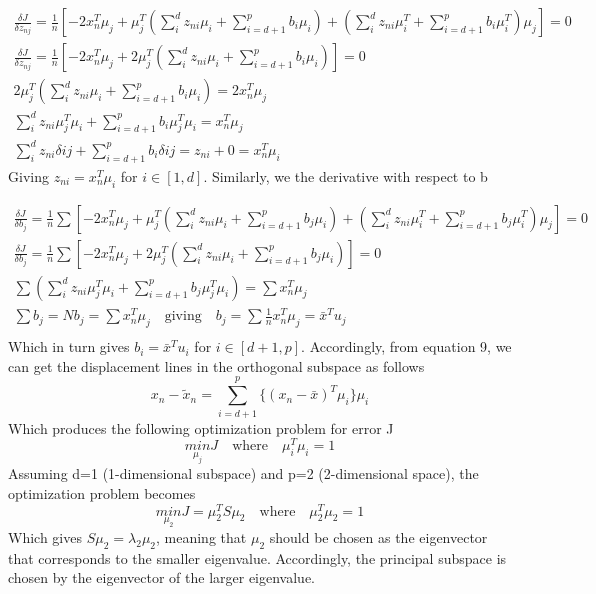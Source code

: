 \documentclass[12pt,a4paper]{article}
\begin{document}
	\vspace{-0.3cm}
	\begin{align*}
		\frac{\delta J}{\delta z_{nj}} = \frac{1}{n}[ -2x_n^T\mu_j+\mu_j^T(\sum_{i}^{d}z_{ni}\mu_i + \sum_{i=d+1}^{p}b_i\mu_i) + (\sum_{i}^{d}z_{ni}\mu_i^T + \sum_{i=d+1}^{p}b_i\mu_i^T)\mu_j] = 0 \\ 
		\frac{\delta J}{\delta z_{nj}} = \frac{1}{n}[ -2x_n^T\mu_j + 2 \mu_j^T(\sum_{i}^{d}z_{ni}\mu_i + \sum_{i=d+1}^{p}b_i\mu_i)] = 0 \qquad \qquad \\ 
		2 \mu_j^T(\sum_{i}^{d}z_{ni}\mu_i + \sum_{i=d+1}^{p}b_i\mu_i)= 2x_n^T\mu_j \qquad \qquad\qquad \quad\\
		\sum_{i}^{d}z_{ni}\mu_j^T\mu_i + \sum_{i=d+1}^{p}b_i\mu_j^T\mu_i=  x_n^T\mu_j \qquad \qquad\qquad \quad \\
		\sum_{i}^{d}z_{ni}\delta ij + \sum_{i=d+1}^{p}b_i\delta ij = z_{ni}+0 = x_n^T\mu_i \qquad \qquad\qquad \quad
	\end{align*}
	Giving $z_{ni}= x_n^T\mu_i$ for $i\in [1,d]$. Similarly, we the derivative with respect to b

	\vspace{-0.3cm}
	\begin{align*}
		\frac{\delta J}{\delta b_{j}} = \frac{1}{n}\sum[ -2x_n^T\mu_j+\mu_j^T(\sum_{i}^{d}z_{ni}\mu_i + \sum_{i=d+1}^{p}b_j\mu_i) + (\sum_{i}^{d}z_{ni}\mu_i^T + \sum_{i=d+1}^{p}b_j\mu_i^T)\mu_j] = 0 \\ 
		\frac{\delta J}{\delta b_{j}} = \frac{1}{n}\sum[ -2x_n^T\mu_j + 2 \mu_j^T(\sum_{i}^{d}z_{ni}\mu_i + \sum_{i=d+1}^{p}b_j\mu_i)] = 0 \qquad \qquad \\ 
		\sum(\sum_{i}^{d}z_{ni}\mu_j^T\mu_i + \sum_{i=d+1}^{p}b_j\mu_j^T\mu_i)=  \sum x_n^T\mu_j \qquad \qquad\qquad \quad \\
		\sum b_j= Nb_j =\sum x_n^T\mu_j \quad \text{giving}\quad b_j = \sum \frac{1}{n}x_n^T\mu_j = \bar{x}^Tu_j\qquad\qquad\\
	\end{align*}
	Which in turn gives $b_i=\bar{x}^Tu_i$ for $i\in [d+1,p]$. Accordingly, from equation 9, we can get the displacement lines in the orthogonal subspace as follows
	\begin{equation}
		x_n - \widetilde{x}_n = \sum_{i=d+1}^{p}\{(x_n-\bar{x})^T\mu_i\}\mu_i
	\end{equation}
	Which produces the following optimization problem for error J
	\begin{equation}
		\underset{\mu_j}{min} J \quad \text{where} \quad \mu_i^T\mu_i=1
	\end{equation}
	Assuming d=1 (1-dimensional subspace) and p=2 (2-dimensional space), the optimization problem becomes
	\begin{equation}
		\underset{\mu_2}{min} J = \mu_2^TS\mu_2 \quad \text{where} \quad \mu_2^T\mu_2=1
	\end{equation}
	Which gives $S\mu_2 = \lambda_2 \mu_2$, meaning that $\mu_2$ should be chosen as the eigenvector that corresponds to the smaller eigenvalue. Accordingly, the principal subspace is chosen by the eigenvector of the larger eigenvalue.
	
\end{document}
